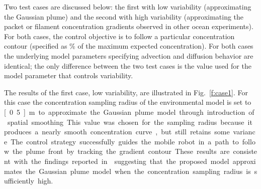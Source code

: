 \documentclass[ letterpaper, 10 pt, conference]{ieeeconf}  %
\begin{document}
Two test cases are discussed below: the first with low variability (approximating the Gaussian plume) and the second with high variability (approximating the packet or filament concentration gradients observed in other ocean experiments).  For both cases, the control objective is to follow a particular concentration contour (specified as \unit[30]{\%} of the maximum expected concentration).  For both cases the underlying model parameters specifying advection and diffusion behavior are identical; the only difference between the two test cases is the value used for the model parameter that controls variability.

The results of the first case, low variability, are illustrated in Fig.~\ref{f:case1}.  For this case the concentration sampling radius of the environmental model is set to \unit[0.5]{m} to approximate the Gaussian plume model through introduction of spatial smoothing.  This value was chosen for the sampling radius because it produces a nearly smooth concentration curve, but still retains some variance.   The control strategy successfully guides the mobile robot in a path to follow the plume front by tracking the gradient contour. These results are consistent with the findings reported in \cite{Li2014} suggesting that the proposed model approximates the Gaussian plume model when the concentration sampling radius is sufficiently high.
\end{document}
